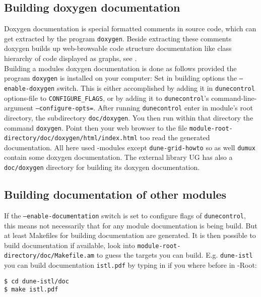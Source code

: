 \subsection{Building doxygen documentation} \label{sec:build-doxy-doc}

Doxygen documentation is special formatted comments in source code, which can get extracted by the program 
\texttt{doxygen}. Beside extracting these comments doxygen builds up web-browsable code structure documentation
like class hierarchy of code displayed as graphs, see \cite{DOXYGEN-HP}.\\

Building a modules doxygen documentation is done as follows provided the program \texttt{doxygen} is installed on your computer: Set in building options the \texttt{--enable-doxygen} switch.
This is either accomplished by adding it in \texttt{dunecontrol} options-file to  \texttt{CONFIGURE\_FLAGS}, or by adding
it to  \texttt{dunecontrol}'s command-line-argument \texttt{--configure-opts=}. 
After running \texttt{dunecontrol} enter in module's root directory, the subdirectory \texttt{doc/doxygen}.
You then run within that directory the command \texttt{doxygen}. Point then your web browser to the file 
\texttt{module-root-directory/doc/doxygen/html/index.html} too read the generated documentation.
All here used \Dune-modules except \texttt{dune-grid-howto} so as well \texttt{dumux} contain some doxygen documentation.
The external library UG has also a \texttt{doc/doxygen} directory for building its doxygen documentation.

\subsection{Building documentation of other \Dune modules}

If the \texttt{--enable-documentation} switch is set to configure flags of \texttt{dunecontrol}, this means not necessarily that for any 
\Dune module documentation is being build. But at least Makefiles for building documentation 
are generated. It is then possible to build documentation if available, look into \texttt{module-root-directory/doc/Makefile.am}
to guess the targets you can build.
E.g. \texttt{dune-istl} you can build documentation \texttt{istl.pdf} by typing in if you where before in \Dune-Root:

\begin{lstlisting}[style=Bash]
$ cd dune-istl/doc
$ make istl.pdf
\end{lstlisting}

